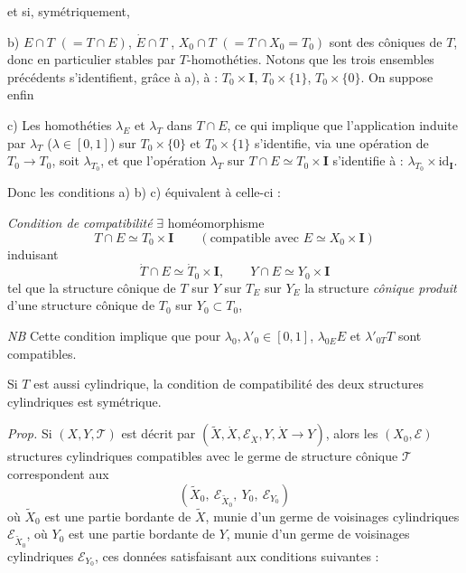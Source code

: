 \documentclass[11pt,a4paper]{article}
\begin{document}
et si, symétriquement, 

b) $E\cap T$ $(=T\cap E)$, $\dot E\cap T$ , $X_0\cap T$ $(=T\cap X_0=T_0)$ sont des  côniques de $T$, donc en particulier stables par $T$-homothéties.  Notons que les trois ensembles précédents s'identifient, grâce à a), à : $T_0\times\mathbf{I}$, $T_0\times\lbrace1\rbrace$, $T_0\times\lbrace0\rbrace$. On suppose enfin

c) Les homothéties  $\lambda_E$ et $\lambda_T$  dans $T\cap E$, ce qui implique que l'application induite par $\lambda_T$ ($\lambda\in[0,1]$) sur $T_0\times\lbrace0\rbrace$ et $T_0\times\lbrace1\rbrace$ s'identifie, via  une opération de $T_0\to T_0$, \struck{\ill{}} soit $\lambda_{T_0}$, et que l'opération $\lambda_T$ sur $T\cap E\simeq T_0\times\mathbf{I}$ s'identifie à : \struck{\ill{}} $\lambda_{T_0}\times\mathrm{id}_{\mathbf{I}}$.

Donc les conditions a) b) c) équivalent à celle-ci :

\emph{Condition de compatibilité} $\exists$ homéomorphisme
\[
T\cap E\simeq T_0\times\mathbf{I}\qquad(\text{compatible avec } E\simeq X_0\times\mathbf{I})
\]
 induisant
\[
\dot T\cap E\simeq\dot T_0\times\mathbf{I},\qquad Y\cap E\simeq Y_0\times\mathbf{I}
\]
tel que la structure cônique de $T$ sur $Y$  sur $T_E$ sur $Y_E$   la structure \emph{cônique produit}  d'une structure cônique de $T_0$ sur $Y_0\subset T_0$, 


\emph{NB} Cette condition implique que pour $\lambda_0,\lambda'_0\in[0,1]$, $\lambda_{0E}E$ et $\lambda'_{0T}T$ sont compatibles.

Si $T$ est aussi cylindrique, la condition  de compatibilité des deux structures cylindriques est symétrique.

\emph{Prop.} \supplied{(}Si $(X,Y,\mathcal T)$ est décrit par $(\tilde X,\dot X,\mathcal E_{\dot X},Y,\dot X\to Y)$\add{)}, alors les  $(X_0,\mathcal E)$  structures cylindriques compatibles avec le germe de structure cônique $\mathcal T$ correspondent aux  
\[
(\tilde X_0,\ \mathcal E_{\tilde X_0},\ Y_0,\ \mathcal E_{Y_0})
\]
où $\tilde X_0$ est une partie bordante de $\tilde X$, munie d'un germe de voisinages cylindriques $\mathcal E_{\tilde X_0}$, où $Y_0$ est une partie bordante de $Y$, munie d'un germe de  voisinages cylindriques $\mathcal E_{Y_0}$, ces données satisfaisant aux conditions suivantes :
\end{document}
